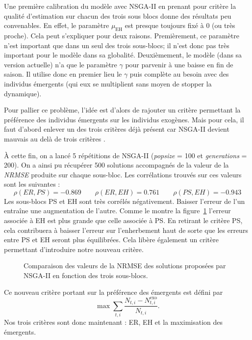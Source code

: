 \documentclass[a4paper, 11pt]{article}
\begin{document}
Une première calibration du modèle avec NSGA-II en prenant pour critère la qualité d'estimation sur chacun des trois sous blocs donne des résultats peu convenables. En effet, le paramètre $\mu_{\text{EH}}$ est presque toujours fixé à 0 (ou très proche). Cela peut s'expliquer pour deux raisons. Premièrement, ce paramètre n'est important que dans un seul des trois sous-blocs; il n'est donc pas très important pour le modèle dans sa globalité. Deuxièmement, le modèle (dans sa version actuelle) n'a que le paramètre $\gamma$ pour parvenir à une baisse en fin de saison. Il utilise donc en premier lieu le $\gamma$ puis complète au besoin avec des individus émergents (qui eux se multiplient sans moyen de stopper la dynamique).

Pour pallier ce problème, l'idée est d'alors de rajouter un critère permettant la préférence des individus émergents sur les individus exogènes. Mais pour cela, il faut d'abord enlever un des trois critères déjà présent car NSGA-II devient mauvais au delà de trois critères \cite{nsga3}.


À cette fin, on a lancé 5 répétitions de NSGA-II (\emph{popsize} = 100 et \emph{generations} = 200). On a ainsi pu récupérer 500 solutions accompagnés de la valeur de la \textit{NRMSE} produite sur chaque sous-bloc. Les corrélations trouvés sur ces valeurs sont les suivantes :
$$
\rho\left( ER, PS \right) = -0.869 \qquad \rho\left( ER, EH \right) = 0.761 \qquad \rho\left(PS, EH \right) = -0.943
$$
Les sous-blocs PS et EH sont très corrélés négativement. Baisser l'erreur de l'un entraîne une augmentation de l'autre. Comme le montre la figure~\ref{fig:cost} l'erreur associée à EH est plus grande que celle associée à PS. En retirant le critère PS, cela contribuera à baisser l'erreur sur l'enherbement haut de sorte que les erreurs entre PS et EH seront plus équilibrées. Cela libère également un critère permettant d'introduire notre nouveau critère.

\begin{figure}[ht]
 \centering
 \caption{Comparaison des valeurs de la NRMSE des solutions proposées par NSGA-II en fonction des trois sous-blocs.}
 \label{fig:cost}
\end{figure}



Ce nouveau critère portant sur la préférence des émergents est défini par 
$$
\max \sum_{t, i}\frac{N_{t,i} - N_{t, i}^{\text{exo}}}{N_{t, i}}.
$$
Nos trois critères sont donc maintenant : ER, EH et la maximisation des émergents.
\end{document}
